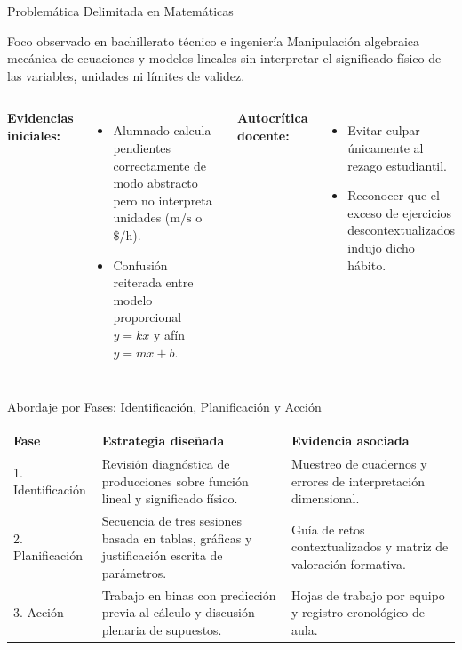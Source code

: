 \documentclass[aspectratio=169,spanish,xcolor=table]{beamer}
\begin{document}
\begin{frame}{Problemática Delimitada en Matemáticas}
  \begin{block}{Foco observado en bachillerato técnico e ingeniería}
    Manipulación algebraica mecánica de ecuaciones y modelos lineales sin interpretar el significado físico de las variables, unidades ni límites de validez.
  \end{block}
  \vspace{0.25cm}
  \begin{columns}[T]
      \textbf{\color{iiiepeNavy}Evidencias iniciales:}
      \begin{itemize}\scriptsize
        \item Alumnado calcula pendientes correctamente de modo abstracto pero no interpreta unidades ($\text{m/s}$ o $\text{\$/h}$).
        \item Confusión reiterada entre modelo proporcional $y=kx$ y afín $y=mx+b$.
      \end{itemize}
      \textbf{\color{iiiepeOrange!85!black}Autocrítica docente:}
      \begin{itemize}\scriptsize
        \item Evitar culpar únicamente al rezago estudiantil.
        \item Reconocer que el exceso de ejercicios descontextualizados indujo dicho hábito.
      \end{itemize}
  \end{columns}
\end{frame}

\begin{frame}{Abordaje por Fases: Identificación, Planificación y Acción}
  \scriptsize\renewcommand{\arraystretch}{1.38}
  \begin{tabular}{p{2.5cm}p{5.5cm}p{5.0cm}}
    \toprule
    \rowcolor{iiiepePale} \textbf{Fase} & \textbf{Estrategia diseñada} & \textbf{Evidencia asociada} \\
    \midrule
    1. Identificación & Revisión diagnóstica de producciones sobre función lineal y significado físico. & Muestreo de cuadernos y errores de interpretación dimensional. \\
    2. Planificación & Secuencia de tres sesiones basada en tablas, gráficas y justificación escrita de parámetros. & Guía de retos contextualizados y matriz de valoración formativa. \\
    3. Acción & Trabajo en binas con predicción previa al cálculo y discusión plenaria de supuestos. & Hojas de trabajo por equipo y registro cronológico de aula. \\
    \bottomrule
  \end{tabular}
\end{frame}
\end{document}
